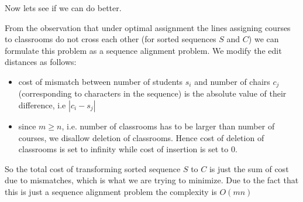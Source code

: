 Now lets see if we can do better.

From the observation that under optimal assignment the lines assigning courses to classrooms do not cross each other (for sorted sequences $S$ and $C$) we can formulate this problem as a sequence alignment problem. We modify the edit distances as follows:

\begin{itemize}
\item cost of mismatch between number of students $s_i$ and number of chairs $c_j$ (corresponding to characters in the sequence) is the absolute value of their difference, i.e $| c_i - s_j |$
\item since $m \geq n$, i.e. number of classrooms has to be larger than number of courses, we disallow deletion of classrooms. Hence cost of deletion of classrooms is set to infinity while cost of insertion is set to 0.   
\end{itemize}

So the total cost of transforming sorted sequence $S$ to $C$ is just the sum of cost due to mismatches, which is what we are trying to minimize. Due to the fact that this is just a sequence alignment problem the complexity is $O(mn)$

